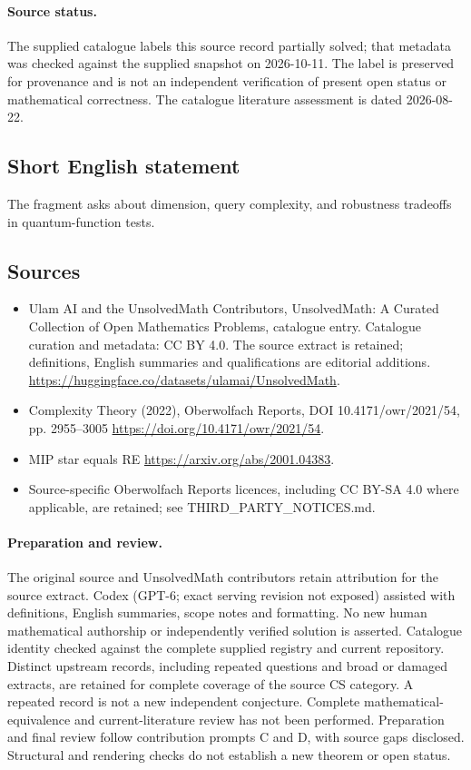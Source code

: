 \documentclass[11pt]{article}
\begin{document}
\paragraph{Source status.}
The supplied catalogue labels this source record partially solved; that metadata was checked against the supplied snapshot on 2026-10-11. The label is preserved for provenance and is not an independent verification of present open status or mathematical correctness. The catalogue literature assessment is dated 2026-08-22.
\subsection{Short English statement}
The fragment asks about dimension, query complexity, and robustness tradeoffs in quantum-function tests.
\subsection{Sources}
\begin{itemize}
\item[\hypertarget{source:statement:1}{S1}] Ulam AI and the UnsolvedMath Contributors, UnsolvedMath: A Curated Collection of Open Mathematics Problems, catalogue entry. Catalogue curation and metadata: CC BY 4.0. The source extract is retained; definitions, English summaries and qualifications are editorial additions.
\url{https://huggingface.co/datasets/ulamai/UnsolvedMath}.
\item[\hypertarget{source:statement:2}{S2}] Complexity Theory (2022), Oberwolfach Reports, DOI 10.4171/owr/2021/54, pp. 2955--3005
\url{https://doi.org/10.4171/owr/2021/54}.
\item[\hypertarget{source:statement:3}{S3}] MIP star equals RE
\url{https://arxiv.org/abs/2001.04383}.
\item Source-specific Oberwolfach Reports licences, including CC BY-SA 4.0 where applicable, are retained; see THIRD\_PARTY\_NOTICES.md.
\end{itemize}
\paragraph{Preparation and review.}
The original source and UnsolvedMath contributors retain attribution for the source extract. Codex (GPT-6; exact serving revision not exposed) assisted with definitions, English summaries, scope notes and formatting. No new human mathematical authorship or independently verified solution is asserted. Catalogue identity checked against the complete supplied registry and current repository. Distinct upstream records, including repeated questions and broad or damaged extracts, are retained for complete coverage of the source CS category. A repeated record is not a new independent conjecture. Complete mathematical-equivalence and current-literature review has not been performed. Preparation and final review follow contribution prompts C and D, with source gaps disclosed. Structural and rendering checks do not establish a new theorem or open status.
\label{end:statement}
\end{document}
